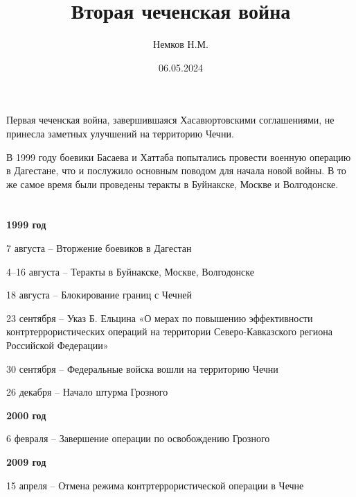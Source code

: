 

\title{Вторая чеченская война}
\author{Немков Н.М.}
\date{06.05.2024}



\begin{frame}
\maketitle
\end{frame}


\begin{frame}{}


	Первая чеченская война, завершившаяся Хасавюртовскими соглашениями, не принесла заметных улучшений на территорию Чечни.



	В 1999 году боевики Басаева и Хаттаба попытались провести военную операцию в Дагестане, что и послужило основным поводом для начала новой войны. В то же самое время были проведены теракты в Буйнакске, Москве и Волгодонске.

\end{frame}

\section{}
\begin{frame}{}
	\textbf{1999 год}

	 7 августа -- Вторжение боевиков в Дагестан

	4–16 августа -- Теракты в Буйнакске, Москве, Волгодонске

	18 августа -- Блокирование границ с Чечней

	23 сентября -- Указ Б. Ельцина «О мерах по повышению эффективности контртеррористических операций на территории Северо-Кавказского региона Российской Федерации»

	30 сентября -- Федеральные войска вошли на территорию Чечни

	26 декабря -- Начало штурма Грозного

	\textbf{2000 год}

	6 февраля -- Завершение операции по освобождению Грозного

	\textbf{2009 год}

	15 апреля -- Отмена режима контртеррористической операции в Чечне

\end{frame}


